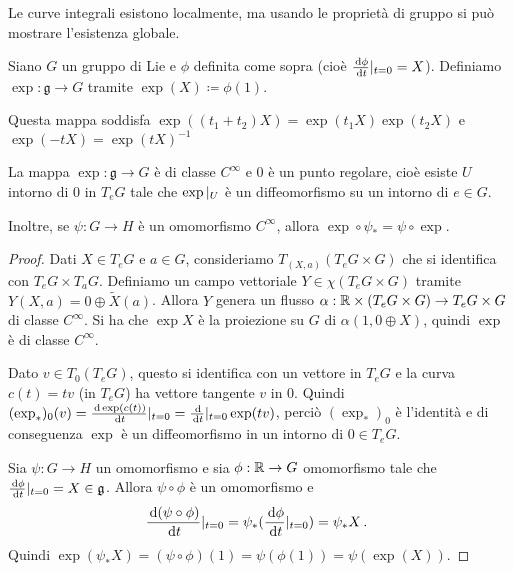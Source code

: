 \begin{remark}
	Le curve integrali esistono localmente, ma usando le proprietà di gruppo  si può mostrare l'esistenza globale.
\end{remark}


\begin{definition}
	Siano $G$ un gruppo di Lie e $\phi$ definita come sopra (cioè $\frac{\,\mathrm d\phi}{\,\mathrm d t}|_{t=0} =X$). Definiamo $\exp: \mathfrak g \to G$ tramite $\exp(X) \coloneqq \phi(1)$.
\end{definition}

Questa mappa soddisfa $\exp((t_1+t_2)X) = \exp(t_1X) \exp(t_2X)$ e $\exp(-tX) = \exp(tX)^{-1}$

\begin{proposition}
	La mappa $\exp: \mathfrak g \to G$ è di classe $C^\infty$ e 0 è un punto regolare, cioè esiste $U$ intorno di 0 in $T_eG$ tale che $\exp|_ U$ è un diffeomorfismo su un intorno di $e\in G$.
	
	Inoltre, se $\psi : G \to H$ è un omomorfismo $C^\infty$, allora $\exp\circ \psi_* = \psi \circ \exp$.
\end{proposition}
\begin{proof}
	Dati $X \in T_eG$ e $a \in G$, consideriamo $T_{(X,a)}(T_eG\times G)$ che si identifica con $T_eG \times T_a G$.
	Definiamo un campo vettoriale $Y \in \chi(T_eG \times G)$ tramite $Y(X,a) = 0 \oplus \tilde X(a)$.
	Allora $Y$ genera un flusso $\alpha: \mathbb R \times (T_eG \times G) \to T_eG \times G$ di classe $C^\infty$. Si ha che $\exp X$ è la proiezione su $G$ di $\alpha(1,0\oplus X)$, quindi $\exp$ è di classe $C^\infty$.
	
	Dato $v\in T_0(T_eG)$, questo si identifica con un vettore in $T_eG$ e la curva $c(t) = tv$ (in $T_eG$) ha vettore tangente $v$ in 0.
	Quindi $(\exp_*)_0 (v) = \frac{\,\mathrm d \exp(c(t))}{\,\mathrm d t}|_ {t=0} = \frac{\,\mathrm d}{\,\mathrm d t} |_ {t=0} \exp(tv)$, perciò $(\exp_*)_0$ è l'identità e di conseguenza $\exp$ è un diffeomorfismo in un intorno di $0\in T_eG$.
	
	Sia $\psi: G \to H$ un omomorfismo e sia $\phi: \mathbb R \to G$ omomorfismo tale che $\frac{\,\mathrm d \phi}{\,\mathrm d t}|_{t=0} = X \in \mathfrak g$.
	Allora $\psi \circ \phi$ è un omomorfismo e 
	\begin{equation*}
		\frac{\,\mathrm d(\psi\circ \phi)}{\,\mathrm d t}|_{t=0} = \psi_*(\frac{\,\mathrm d \phi}{\,\mathrm d t}|_{t=0}) = \psi_*X\, \text{. }
	\end{equation*}
	Quindi $\exp(\psi_*X) = (\psi\circ\phi)(1) = \psi(\phi(1)) = \psi(\exp(X))$.
\end{proof}


